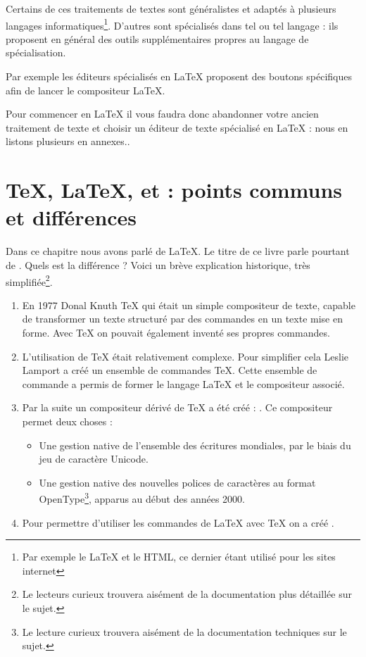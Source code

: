 Certains de ces traitements de textes sont généralistes et adaptés à plusieurs langages informatiques\footnote{Par exemple le \LaTeX{} et le HTML, ce dernier étant utilisé pour les sites internet}. D'autres sont spécialisés dans tel ou tel langage : ils proposent en général des outils supplémentaires propres au langage de spécialisation. 

Par exemple les éditeurs spécialisés en \LaTeX{} proposent des boutons spécifiques afin de lancer le compositeur \LaTeX{}.

Pour commencer en \LaTeX{} il vous faudra donc abandonner votre ancien traitement de texte et choisir un éditeur de texte spécialisé en \LaTeX{} : nous en listons plusieurs en annexes..

\section[TeX, LaTeX, XeTeX, XeLaTeX : points communs et différences]{\TeX{}, \LaTeX{}, \XeTeX{} et \XeLaTeX{} : points communs et différences}

Dans ce chapitre nous avons parlé de \LaTeX{}. Le titre de ce livre parle pourtant  de \XeLaTeX{}. Quels est la différence ? Voici un brève explication historique, très simplifiée\footnote{Le lecteurs curieux trouvera aisément de la documentation plus détaillée sur le sujet.}.

\begin{enumerate}
\item En 1977 Donal Knuth \TeX{} qui était un simple compositeur de texte, capable de transformer un texte structuré par des commandes en un texte mise en forme. Avec \TeX{} on pouvait également inventé ses propres commandes.
\item L'utilisation de \TeX{} était relativement complexe. Pour simplifier cela Leslie Lamport a créé un ensemble de commandes \TeX{}. Cette ensemble de commande a permis de former le langage \LaTeX{} et le compositeur associé.
\item Par la suite un compositeur dérivé de \TeX{} a été créé : \XeTeX{}. Ce compositeur permet deux choses :
\begin{itemize}
	\item Une gestion native de l'ensemble des écritures mondiales, par le biais du jeu de caractère Unicode.
	\item Une gestion native des nouvelles polices de caractères au format OpenType\footnote{Le lecture curieux trouvera aisément de la documentation techniques sur le sujet.}, apparus au début des années 2000.

\end{itemize} 
\item Pour permettre d'utiliser les commandes de \LaTeX{} avec \TeX{} on a créé \XeLaTeX{}.
\end{enumerate}

